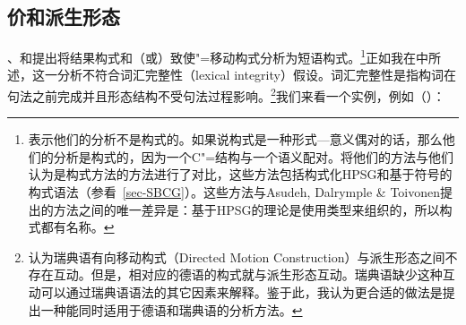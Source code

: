 \subsection{价和派生形态}
\label{sec-val-morph}\label{sec-phrasal-LI}\label{sec-inheritance-passive-LFG}
\citet{GJ2004a}、\citet{Alsina96a}和\citet*{ADT2008a,ADT2013a}提出将结果构式和（或）致使"=移动构式分析为短语构式。\footnote{%
\citet[\S~2.3]{AT2014a}表示他们的分析不是构式的。如果说构式是一种形式—意义偶对的话，那么他们的分析是构式的，因为一个C"=结构与一个语义配对。\citet[\S~2.2]{AT2014a}将他们的方法与他们认为是构式方法的方法进行了对比，这些方法包括构式化HPSG\citep{Sag97a}和基于符号的构式语法（参看~\ref{sec-SBCG}）。这些方法与Asudeh, Dalrymple \& Toivonen提出的方法之间的唯一差异是：基于HPSG的理论是使用类型来组织的，所以构式都有名称。%
}正如我在中所述，这一分析不符合词汇完整性（lexical integrity）假设。词汇完整性是指构词在句法之前完成并且形态结构不受句法过程影响\citep{BM95a}。\footnote{%
  \citet[]{ADT2013a} 认为瑞典语有向移动构式（Directed Motion Construction）与派生形态之间不存在互动。但是，相对应的德语的构式就与派生形态互动。瑞典语缺少这种互动可以通过瑞典语语法的其它因素来解释。鉴于此，我认为更合适的做法是提出一种能同时适用于德语和瑞典语的分析方法。%
}我们来看一个实例，例如（）：
